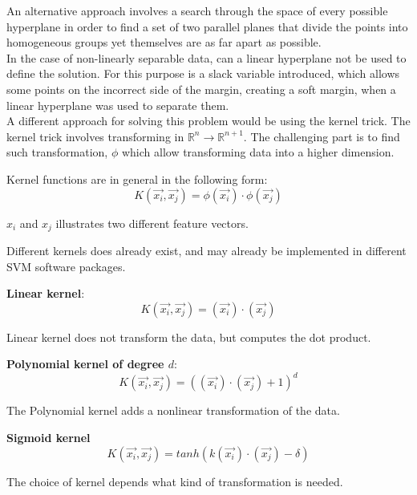 An alternative approach involves a search through the space of every possible hyperplane in order to find a set of two parallel planes that divide the points into homogeneous groups yet themselves are as far apart as possible.\\


In the case of non-linearly separable data, can a linear hyperplane not be used to define the solution. For this purpose is a slack variable introduced, which allows some points on the incorrect side of the margin, creating a soft margin, when a linear hyperplane was used to separate them.\\

A different approach for solving this problem would be using the kernel trick. The kernel trick involves transforming in $\mathbb{R}^n \rightarrow \mathbb{R}^{n+1}$. The challenging part is to find such transformation, $\phi$ which allow transforming data into a higher dimension. 

Kernel functions are in general in the following form:
\begin{equation}
K(\overrightarrow{x_i},\overrightarrow{x_j}) = \phi(\overrightarrow{x_i}) \cdot \phi(\overrightarrow{x_j}) 
\end{equation}

$x_i$ and $x_j$ illustrates two different feature vectors. 

Different kernels does already exist, and may already be implemented in different SVM software packages. 

\textbf{Linear kernel}:
\begin{equation}
K(\overrightarrow{x_i},\overrightarrow{x_j}) = (\overrightarrow{x_i}) \cdot (\overrightarrow{x_j}) 
\end{equation}

Linear kernel does not transform the data, but computes the dot product. 

\textbf{Polynomial kernel of degree $d$}:
\begin{equation}
K(\overrightarrow{x_i},\overrightarrow{x_j}) = ((\overrightarrow{x_i}) \cdot (\overrightarrow{x_j})+1)^d
\end{equation}

The Polynomial kernel adds a nonlinear transformation of the data.


\textbf{Sigmoid kernel}
\begin{equation}
K(\overrightarrow{x_i},\overrightarrow{x_j}) = tanh( k(\overrightarrow{x_i}) \cdot (\overrightarrow{x_j}) - \delta)
\end{equation}

The choice of kernel depends what kind of transformation is needed. 